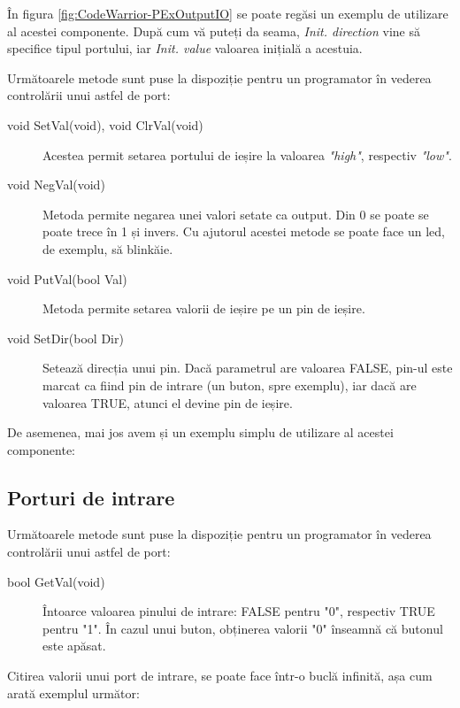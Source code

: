 În figura \ref{fig:CodeWarrior-PExOutputIO} se poate regăsi un exemplu de utilizare al acestei componente. După cum vă puteți da seama, \textit{Init. direction} vine să specifice tipul portului, iar \textit{Init. value} valoarea inițială a acestuia.

Următoarele metode sunt puse la dispoziție pentru un programator în vederea controlării unui astfel de port:
\begin{description}
    \item[void SetVal(void), void ClrVal(void)] Acestea permit setarea portului de ieșire la valoarea \textit{"high"}, respectiv \textit{"low"}. 
    \item[void NegVal(void)] Metoda permite negarea unei valori setate ca output. Din 0 se poate se poate trece în 1 și invers. Cu ajutorul acestei metode se poate face un led, de exemplu, să blinkăie.
    \item[void PutVal(bool Val)] Metoda permite setarea valorii de ieșire pe un pin de ieșire.
    \item[void SetDir(bool Dir)] Setează direcția unui pin. Dacă parametrul are valoarea FALSE, pin-ul este marcat ca fiind pin de intrare (un buton, spre exemplu), iar dacă are valoarea TRUE, atunci el devine pin de ieșire.
\end{description}

De asemenea, mai jos avem și un exemplu simplu de utilizare al acestei componente:



\subsection{Porturi de intrare}

Următoarele metode sunt puse la dispoziție pentru un programator în vederea controlării unui astfel de port:

\begin{description}
    \item[bool GetVal(void)] Întoarce valoarea pinului de intrare: FALSE pentru "0", respectiv TRUE pentru "1". În cazul unui buton, obținerea valorii "0" înseamnă că butonul este apăsat.
\end{description}

Citirea valorii unui port de intrare, se poate face într-o buclă infinită, așa cum arată exemplul următor:



